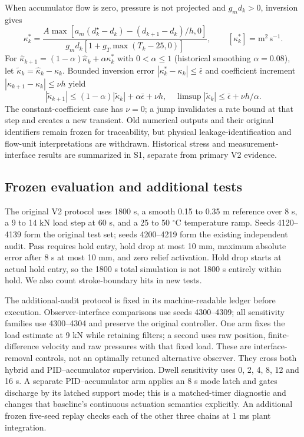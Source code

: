 \documentclass[machines,article,submit,pdftex,moreauthors]{Definitions/mdpi}
\begin{document}
When accumulator flow is zero, pressure is not projected and $g_md_k>0$, inversion gives
\begin{equation}
\kappa_k^*=\frac{A\max[a_m(d_k^\star-d_k)-(d_{k+1}-d_k)/h,0]}{g_md_k[1+g_T\max(T_k-25,0)]},\qquad [\kappa_k^*]=\mathrm{m^2\,s^{-1}}.
\label{eq:legacy-proxy}
\end{equation}
For $\hat\kappa_{k+1}=(1-\alpha)\hat\kappa_k+\alpha\kappa_k^*$ with $0<\alpha\le1$ (historical smoothing $\alpha=0.08$), let $\widetilde\kappa_k=\hat\kappa_k-\kappa_k$. Bounded inversion error $|\kappa_k^*-\kappa_k|\le\bar\epsilon$ and coefficient increment $|\kappa_{k+1}-\kappa_k|\le\nu h$ yield
\begin{equation}
|\widetilde\kappa_{k+1}|\le(1-\alpha)|\widetilde\kappa_k|+\alpha\bar\epsilon+\nu h,
\quad \limsup|\widetilde\kappa_k|\le\bar\epsilon+\nu h/\alpha.
\label{eq:time-varying}
\end{equation}
The constant-coefficient case has $\nu=0$; a jump invalidates a rate bound at that step and creates a new transient. Old numerical outputs and their original identifiers remain frozen for traceability, but physical leakage-identification and flow-unit interpretations are withdrawn. Historical stress and measurement-interface results are summarized in S1, separate from primary V2 evidence.

\subsection{Frozen evaluation and additional tests}
The original V2 protocol uses 1800 s, a smooth 0.15 to 0.35 m reference over 8 s, a 9 to 14 kN load step at 60 s, and a 25 to 50 $^\circ$C temperature ramp. Seeds 4120--4139 form the original test set; seeds 4200--4219 form the existing independent audit. Pass requires hold entry, hold drop at most 10 mm, maximum absolute error after 8 s at most 10 mm, and zero relief activation. Hold drop starts at actual hold entry, so the 1800 s total simulation is not 1800 s entirely within hold. We also count stroke-boundary hits in new tests.

The additional-audit protocol is fixed in its machine-readable ledger before execution. Observer-interface comparisons use seeds 4300--4309; all sensitivity families use 4300--4304 and preserve the original controller. One arm fixes the load estimate at 9 kN while retaining filters; a second uses raw position, finite-difference velocity and raw pressures with that fixed load. These are interface-removal controls, not an optimally retuned alternative observer. They cross both hybrid and PID--accumulator supervision. Dwell sensitivity uses 0, 2, 4, 8, 12 and 16 s. A separate PID--accumulator arm applies an 8 s mode latch and gates discharge by its latched support mode; this is a matched-timer diagnostic and changes that baseline's continuous actuation semantics explicitly. An additional frozen five-seed replay checks each of the other three chains at 1 ms plant integration.
\end{document}
